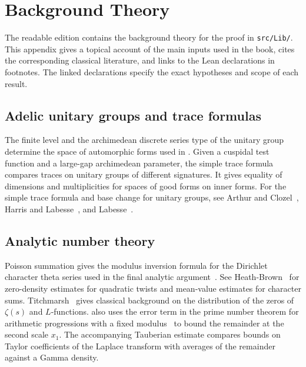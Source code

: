\chapter{Background Theory}
\label{app:lib-overview}

The readable edition contains the background theory for the proof in \texttt{src/Lib/}. This appendix gives a topical account of the main inputs used in the book, cites the corresponding classical literature, and links to the Lean declarations in footnotes. The linked declarations specify the exact hypotheses and scope of each result.

\section{Adelic unitary groups and trace formulas}

The finite level and the archimedean discrete series type of the unitary group determine the space of automorphic forms used in . Given a cuspidal test function and a large-gap archimedean parameter, the simple trace formula compares traces on unitary groups of different signatures. It gives equality of dimensions and multiplicities for spaces of good forms on inner forms. For the simple trace formula and base change for unitary groups, see Arthur and Clozel~\cite{ArthurClozel1989}, Harris and Labesse~\cite{HarrisLabesse2004}, and Labesse~\cite{Labesse2011}.

\section{Analytic number theory}

Poisson summation gives the modulus inversion formula for the Dirichlet character theta series used in the final analytic argument~\cite{Davenport2000,IwaniecKowalski2004,MontgomeryVaughan2007}. See Heath-Brown~\cite{HeathBrown1995} for zero-density estimates for quadratic twists and mean-value estimates for character sums. Titchmarsh~\cite{Titchmarsh1986} gives classical background on the distribution of the zeros of $\zeta(s)$ and $L$-functions.  also uses the error term in the prime number theorem for arithmetic progressions with a fixed modulus~\cite{MontgomeryVaughan2007} to bound the remainder at the second scale $x_1$. The accompanying Tauberian estimate compares bounds on Taylor coefficients of the Laplace transform with averages of the remainder against a Gamma density.


